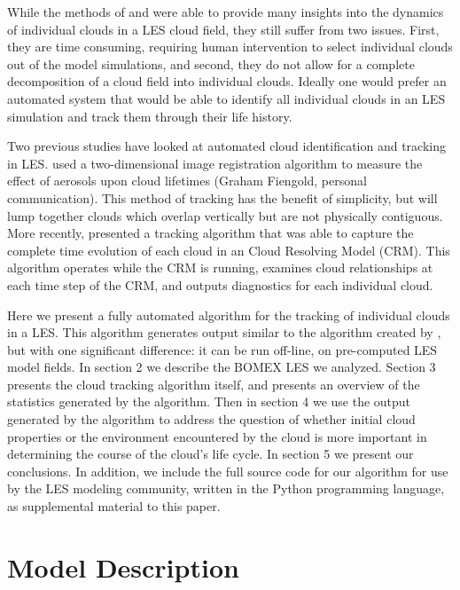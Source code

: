 \documentclass[acp]{copernicus}
\begin{document}
While the methods of \citeauthor{Zhao2005} and \citeauthor{Heus2009} were 
able to provide many insights into the dynamics of individual clouds in a 
LES cloud field, they still suffer from two issues.  First, they are time 
consuming, requiring human intervention to select individual clouds out of 
the model simulations, and second, they do not allow for a complete 
decomposition of a cloud field into individual clouds.  Ideally one would 
prefer an automated system that would be able to identify all individual clouds 
in an LES simulation and track them through their life history.

Two previous studies have looked at automated cloud identification and tracking 
in LES. \cite{Jiang2006} used a two-dimensional image registration algorithm 
to measure the effect of aerosols upon cloud lifetimes (Graham Fiengold, 
personal communication).  This method of tracking has the benefit of 
simplicity, but will lump together clouds which overlap vertically but are not 
physically contiguous.  More recently, \cite{Plant2009} presented a tracking 
algorithm that was able to capture the complete time evolution of each cloud in 
an Cloud Resolving Model (CRM). This algorithm operates while the CRM is 
running, examines cloud relationships at each time step of the CRM, and outputs 
diagnostics for each individual cloud.

Here we present a fully automated algorithm for the tracking of individual 
clouds in a LES. This algorithm generates output similar to the algorithm 
created by \cite{Plant2009}, but with one significant difference: it can be 
run off-line, on pre-computed LES model fields.  In section 2 we describe the 
BOMEX LES we analyzed.  Section 3 presents the cloud tracking algorithm itself, 
and presents an overview of the statistics generated by the algorithm.  Then in 
section 4 we use the output generated by the algorithm to address the question 
of whether initial cloud properties or the environment encountered by the cloud 
is more important in determining the course of the cloud's life cycle.  
In section 5 we present our conclusions.  In addition, we include the full 
source code for our algorithm for use by the LES modeling community, written in 
the Python programming language, as supplemental material to this paper.


\section{Model Description}
\end{document}
